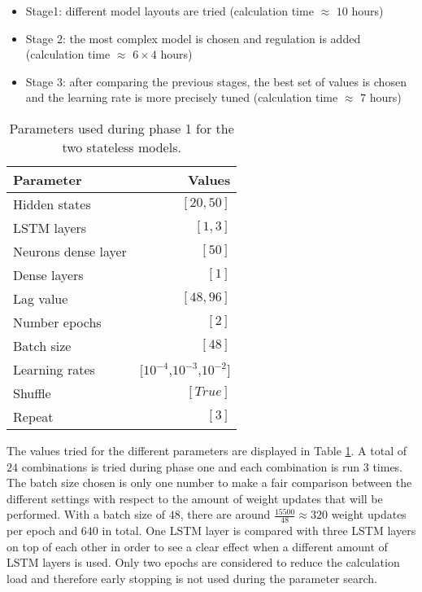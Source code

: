 \begin{itemize}
	\item Stage1: different model layouts are tried (calculation time $ \approx $ $ 10 $ hours)
	\item Stage 2: the most complex model is chosen and regulation is added (calculation time $ \approx $ $ 6\times4 $ hours)
	\item Stage 3: after comparing the previous stages, the best set of values is chosen and the learning rate is more precisely tuned (calculation time $ \approx $ $7$ hours)
\end{itemize}

\begin{table}[ht]
	\centering
	\begin{tabular}{@{}l|r@{}} \toprule
		\textbf{Parameter}	& \textbf{Values}\\\midrule
		Hidden states &  $ [20,50] $\\
		LSTM layers & $ [1,3] $\\
		Neurons dense layer & $ [50] $\\
		Dense layers & $ [1] $\\
		Lag value & $ [48,96] $\\
		Number epochs & $ [2] $\\
		Batch size & $ [48] $\\
		Learning rates & $[ 10^{-4} $,$ 10^{-3} $,$ 10^{-2} ]$\\
		Shuffle & $ [True] $\\
		Repeat & $ [3] $\\\bottomrule
	\end{tabular}
	\caption{Parameters used during phase 1 for the two stateless models.}
	\label{tab:para_phase1}
\end{table}

The values tried for the different parameters are displayed in Table \ref{tab:para_phase1}. A total of $ 24 $ combinations is tried during phase one and each combination is run $ 3 $ times. The batch size chosen is only one number to make a fair comparison between the different settings with respect to the amount of weight updates that will be performed. With a batch size of $ 48 $, there are around $ \frac{15500}{48}\approx 320 $ weight updates per epoch and $ 640 $ in total. One LSTM layer is compared with three LSTM layers on top of each other in order to see a clear effect when a different amount of LSTM layers is used. Only two epochs are considered to reduce the calculation load and therefore early stopping is not used during the parameter search.\\

